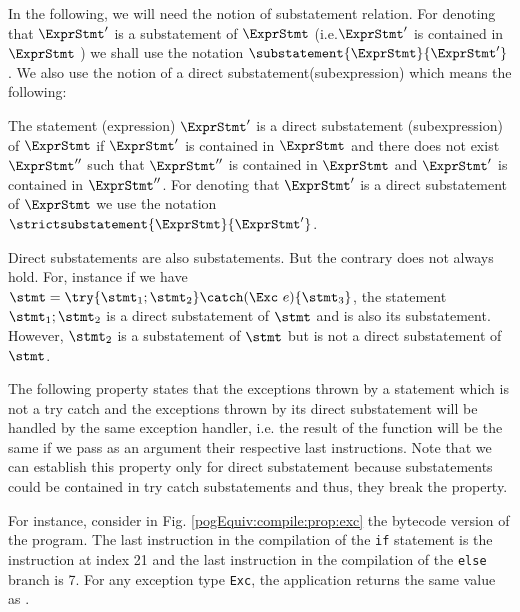 




In the following,  we will need the notion of substatement relation.
 For denoting that  $\ExprStmt'$ is a substatement of  $\ExprStmt$ (i.e.$\ExprStmt'$ is contained in  $\ExprStmt$  )
we shall use the notation $\substatement{\ExprStmt }{\ExprStmt'}$. 
We also use the notion of a direct substatement(subexpression) which  means the following:

\begin{seqInstr} \label{pogCompile:compile:prop:direct}
 The statement (expression) $\ExprStmt'$ is a direct substatement (subexpression) of  $\ExprStmt$
if $\ExprStmt'$  is contained in $\ExprStmt$ 
and there does not exist  $\ExprStmt''$  such that  $\ExprStmt''$ is contained in   $\ExprStmt$ and  $\ExprStmt'$ is contained in  $\ExprStmt''$.
For denoting that  $\ExprStmt'$ is a direct substatement of  $\ExprStmt$
we use the notation $\strictsubstatement{\ExprStmt }{\ExprStmt'}$.
\end{seqInstr}
Direct substatements are also substatements. But the contrary does not always hold. 
For, instance if we have $\stmt = \try \{ \stmt_1;\stmt_2 \} \catch ( \Exc \ e ) \{ \stmt_3\} $,
 the statement $\stmt_1;\stmt_2  $ is a direct substatement of $\stmt$ and is also its substatement. However,   $\stmt_2  $ is a substatement of    $\stmt$
but is not a direct substatement of $\stmt$.

The following property states that the exceptions thrown by a 
statement which is not a try catch and the  exceptions thrown by its direct substatement
will be handled by the same exception handler, i.e. the result of the function \findExcHandlerOnly{} will be the same 
if we pass as an argument their respective last instructions. Note that we can establish this property only
for direct substatement because  substatements could be contained in try catch substatements and
 thus, they   break the property.

 For instance, consider in Fig. \ref{pogEquiv:compile:prop:exc} 
the bytecode version of the program. The last  instruction in the compilation of the \lstinline!if! statement is the 
instruction at index 21 and the last instruction in the compilation of the \lstinline!else! branch is 7. 
For any exception type \mbox{\rm\tt{Exc}}, the application  returns the same value  as
. 

